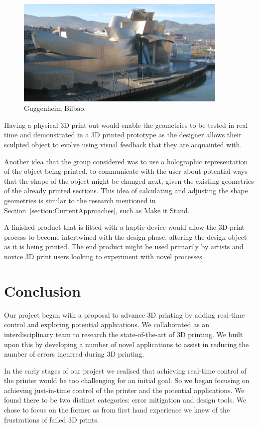 \documentclass[pdftex, 11pt]{report} %
\begin{document}
\begin{figure}[H]
  \centering
  \includegraphics[width=4in]{GuggenheimBilbao.png}
  \caption{Guggenheim Bilbao.}
  \label{figure:GuggenheimBilbao}
\end{figure}

Having a physical 3D print out would enable the geometries to be tested in real time and demonstrated in a 3D printed prototype as the designer allows their sculpted object to evolve using visual feedback that they are acquainted with. 

	Another idea that the group considered was to use a holographic representation of the object being printed, to communicate with the user about potential ways that the shape of the object might be changed next, given the existing geometries of the already printed sections. This idea of calculating and adjusting the shape geometries is similar to the research mentioned in Section~\ref{section:CurrentApproaches}, such as Make it Stand.

	A finished product that is fitted with a haptic device would allow the 3D print process to become intertwined with the design phase, altering the design object as it is being printed. The end product might be used primarily by artists and novice 3D print users looking to experiment with novel processes.   



\chapter{Conclusion}
Our project began with a proposal to advance 3D printing by adding real-time control and exploring potential applications. We collaborated as an interdisciplinary team to research the state-of-the-art of 3D printing. We built upon this by developing a number of novel applications to assist in reducing the number of errors incurred during 3D printing. 

In the early stages of our project we realised that achieving real-time control of the printer would be too challenging for an initial goal. So we began focusing on achieving just-in-time control of the printer and the potential applications. We found there to be two distinct categories: error mitigation and design tools. We chose to focus on the former as from first hand experience we knew of the frustrations of failed 3D prints.   
\end{document}
